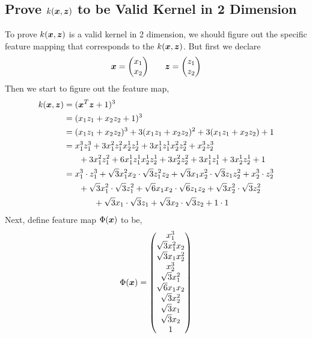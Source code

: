 \documentclass[11pt,a4paper]{article}
\newcommand{\htab}{\hspace*{0.63cm}}
\newcommand{\dhtab}{\hspace*{1.26cm}}
\begin{document}
\subsection{Prove $k(\boldsymbol{x},\boldsymbol{z})$ to be Valid Kernel in 2 Dimension} \label{sec:2dkernel}
\htab To prove $k(\boldsymbol{x},\boldsymbol{z})$ is a valid kernel in 2 dimension, we should figure out the specific feature mapping that corresponds to the $k(\boldsymbol{x},\boldsymbol{z})$. But first we declare 
    \begin{align}
    \xx = \begin{pmatrix} \xone \\ \xtwo \\ \end{pmatrix} \htab
    \zz = \begin{pmatrix} \zone \\ \ztwo \\ \end{pmatrix}
    \end{align}
\htab Then we start to figure out the feature map,
    \begin{align}
        \kernel &= (\xx^{T} \zz + 1)^{3} \\
                & = (\xzcombo + 1)^{3} \\
                & = (\xzcombo)^{3} + 3(\xzcombo)^{2} + 3(\xzcombo) + 1 \\
                & = \xzone{3} + 3\xzone{2}\xztwo{1} + 3\xzone{1}\xztwo{2} + \xztwo{3} \nonumber \\ 
                & \htab + 3\xzone{2} + 6 \xzone{1}\xztwo{1} + 3\xztwo{2} + 3\xzone{1} + 3\xztwo{1} + 1 \\
        & = x_{1}^{3} \cdot z_{1}^{3} + \sqrt{3}x_{1}^{2}x_{2} \cdot \sqrt{3} z_{1}^{2}z_{2} 
            + \sqrt{3}x_{1}x_{2}^{2} \cdot \sqrt{3} z_{1}z_{2}^{2} + x_{2}^{3} \cdot z_{2}^{3} \nonumber \\ 
        & \htab + \sqrt{3} x_{1}^{2} \cdot \sqrt{3} z_{1}^{2} + \sqrt{6} x_{1}x_{2} \cdot \sqrt{6} z_{1}z_{2} 
            + \sqrt{3} x_{2}^{2} \cdot \sqrt{3} z_{2}^{2} \nonumber \\
            &\dhtab + \sqrt{3}x_{1} \cdot \sqrt{3}z_{1} + \sqrt{3} x_{2} \cdot \sqrt{3} z_{2} + 1 \cdot 1 
    \end{align}
\htab Next, define feature map $\Phi(\boldsymbol{x})$ to be,
    \begin{align}
        \Phi(\boldsymbol{x}) = \begin{pmatrix} 
            x_{1}^{3} \\ \sqrt{3} x_{1}^{2}x_{2} \\ \sqrt{3}x_{1}x_{2}^{2} \\ x_{2}^{3} \\
            \sqrt{3} x_{1}^{2} \\ \sqrt{6}x_{1}x_{2} \\ \sqrt{3}x_{2}^{2} \\ 
            \sqrt{3}x_{1} \\ \sqrt{3} x_{2} \\ 1
        \end{pmatrix}
    \end{align}
\end{document}
